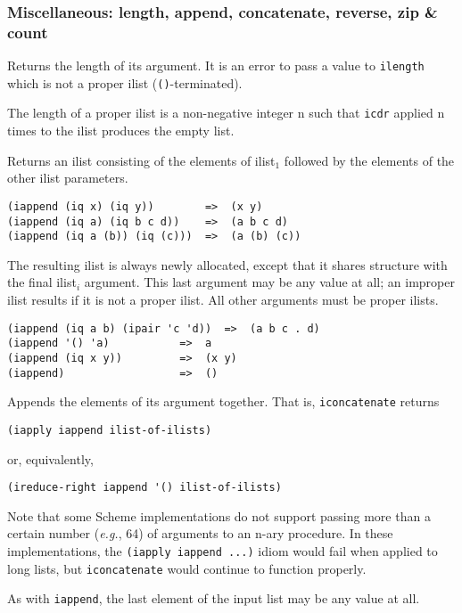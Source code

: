 \subsubsection{Miscellaneous: length, append, concatenate, reverse, zip \& count}

\begin{entry}{%
  }

  Returns the
  length of its argument. It is an error to pass a value to
  \texttt{ilength} which is not a proper ilist
  (\texttt{()}-terminated).

  The length of a proper ilist is a non-negative integer n such that
  \texttt{icdr} applied n times to the ilist produces the empty list.
\end{entry}

\begin{entry}{%
  }

  Returns an ilist consisting of the elements of ilist$_1$ followed by
  the elements of the other ilist parameters.

\begin{verbatim}
(iappend (iq x) (iq y))        =>  (x y)
(iappend (iq a) (iq b c d))    =>  (a b c d)
(iappend (iq a (b)) (iq (c)))  =>  (a (b) (c))
\end{verbatim}

  The resulting ilist is always newly allocated, except that it shares
  structure with the final ilist$_i$ argument. This last argument may
  be any value at all; an improper ilist results if it is not a proper
  ilist. All other arguments must be proper ilists.

\begin{verbatim}
(iappend (iq a b) (ipair 'c 'd))  =>  (a b c . d)
(iappend '() 'a)           =>  a
(iappend (iq x y))         =>  (x y)
(iappend)                  =>  ()
\end{verbatim}
\end{entry}

\begin{entry}{%
  }

Appends the elements of its argument together. That is,
  \texttt{iconcatenate} returns

\begin{verbatim}
(iapply iappend ilist-of-ilists)
\end{verbatim}

  or, equivalently,

\begin{verbatim}
(ireduce-right iappend '() ilist-of-ilists)
\end{verbatim}

  Note that some Scheme implementations do not support passing more
  than a certain number (\emph{e.g.}, 64) of arguments to an n-ary
  procedure. In these implementations, the \texttt{(iapply\ iappend\
    ...)} idiom would fail when applied to long lists, but
  \texttt{iconcatenate} would continue to function properly.

  As with \texttt{iappend}, the last element of the input list may be
  any value at all.
\end{entry}

